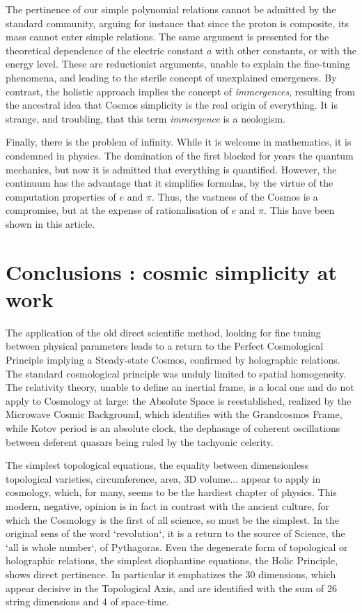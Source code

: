 \documentclass[twoside,draft]{article}
\begin{document}
\begin{sloppypar}
The pertinence of our simple polynomial relations cannot be admitted by the standard community, arguing for instance that since the proton is composite, its mass cannot enter simple relations. The same argument is presented for the theoretical dependence of the electric constant $a$ with other constants, or with the energy level. These are reductionist arguments, unable to explain the fine-tuning phenomena, and leading to the sterile concept of unexplained emergences. By contrast, the holistic approach implies the concept of \textit{immergences}, resulting from the ancestral idea that Cosmos simplicity is the real origin of everything. It is strange, and troubling, that this term \textit{immergence} is a neologism.

Finally, there is the problem of infinity. While it is welcome in mathematics, it is condemned in physics. The domination of the first blocked for years the quantum mechanics, but now it is admitted that everything is quantified. However, the continuum has the advantage that it simplifies formulas, by the virtue of the computation properties of $e$ and $\pi$. Thus, the vastness of the Cosmos is a compromise, but at the expense of rationalisation of $e$ and $\pi$. This have been shown in this article.

\section {Conclusions : cosmic simplicity at work}

The application of the old direct scientific method, looking for fine tuning between physical
parameters leads to a return to the Perfect Cosmological Principle implying a Steady-state Cosmos,
confirmed by holographic relations. The standard cosmological principle was unduly limited to
spatial homogeneity. The relativity theory, unable to define an inertial frame, is a local one and do
not apply to Cosmology at large: the Absolute Space is reestablished, realized by the Microwave
Cosmic Background, which identifies with the Grandcosmos Frame, while Kotov period is an
absolute clock, the dephasage of coherent oscillations between deferent quasars being ruled by the tachyonic celerity.

The simplest topological equations, the equality between dimensionless topological varieties,
circumference, area, 3D volume... appear to apply in cosmology, which, for many, seems to be the hardiest
chapter of physics. This modern, negative, opinion is in fact in contrast with the ancient culture, for
which the Cosmology is the first of all science, so must be the simplest. In the original sens of the
word `revolution`, it is a return to the source of Science, the `all is whole number`, of Pythagoras.
Even the degenerate form of topological or holographic relations, the simplest diophantine
equations, the Holic Principle, shows direct pertinence. In particular it emphatizes the 30
dimensions, which appear decisive in the Topological Axis, and are identified with the sum of 26 string
dimensions and 4 of space-time.


\end{sloppypar}
\end{document}
